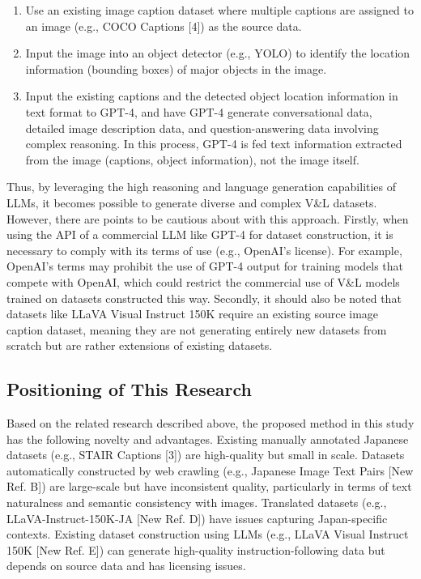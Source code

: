 \documentclass[11pt]{article}
\begin{document}
\begin{enumerate}
  \item Use an existing image caption dataset where multiple captions are assigned to an image (e.g., COCO Captions [4]) as the source data.
  \item Input the image into an object detector (e.g., YOLO) to identify the location information (bounding boxes) of major objects in the image.
  \item Input the existing captions and the detected object location information in text format to GPT-4, and have GPT-4 generate conversational data, detailed image description data, and question-answering data involving complex reasoning. In this process, GPT-4 is fed text information extracted from the image (captions, object information), not the image itself.
\end{enumerate}

Thus, by leveraging the high reasoning and language generation capabilities of LLMs, it becomes possible to generate diverse and complex V\&L datasets. However, there are points to be cautious about with this approach. Firstly, when using the API of a commercial LLM like GPT-4 for dataset construction, it is necessary to comply with its terms of use (e.g., OpenAI's license). For example, OpenAI's terms may prohibit the use of GPT-4 output for training models that compete with OpenAI, which could restrict the commercial use of V\&L models trained on datasets constructed this way. Secondly, it should also be noted that datasets like LLaVA Visual Instruct 150K require an existing source image caption dataset, meaning they are not generating entirely new datasets from scratch but are rather extensions of existing datasets.

\subsection{Positioning of This Research}

Based on the related research described above, the proposed method in this study has the following novelty and advantages.
Existing manually annotated Japanese datasets (e.g., STAIR Captions [3]) are high-quality but small in scale. Datasets automatically constructed by web crawling (e.g., Japanese Image Text Pairs [New Ref. B]) are large-scale but have inconsistent quality, particularly in terms of text naturalness and semantic consistency with images. Translated datasets (e.g., LLaVA-Instruct-150K-JA [New Ref. D]) have issues capturing Japan-specific contexts. Existing dataset construction using LLMs (e.g., LLaVA Visual Instruct 150K [New Ref. E]) can generate high-quality instruction-following data but depends on source data and has licensing issues.
\end{document}
